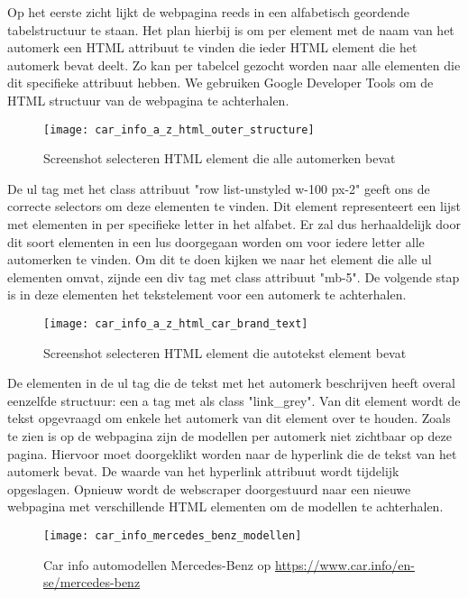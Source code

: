 Op het eerste zicht lijkt de webpagina reeds in een alfabetisch geordende tabelstructuur te staan. 
Het plan hierbij is om per element met de naam van het automerk een HTML attribuut te vinden die ieder HTML element die het automerk bevat deelt. Zo kan per tabelcel gezocht worden naar alle elementen die dit specifieke attribuut hebben.
We gebruiken Google Developer Tools om de HTML structuur van de webpagina te achterhalen.
\begin{figure}[H]
	\centering
	\texttt{[image: car\_info\_a\_z\_html\_outer\_structure]}
	\caption{Screenshot selecteren HTML element die alle automerken bevat}
\end{figure}
De ul tag met het class attribuut "row list-unstyled w-100 px-2" geeft ons de correcte selectors om deze elementen te vinden.
Dit element representeert een lijst met elementen in per specifieke letter in het alfabet. 
Er zal dus herhaaldelijk door dit soort elementen in een lus doorgegaan worden om voor iedere letter alle automerken te vinden.
Om dit te doen kijken we naar het element die alle ul elementen omvat, zijnde een div tag met class attribuut "mb-5".
De volgende stap is in deze elementen het tekstelement voor een automerk te achterhalen.
\begin{figure}[H]
	\centering
	\texttt{[image: car\_info\_a\_z\_html\_car\_brand\_text]}
	\caption{Screenshot selecteren HTML element die autotekst element bevat}
\end{figure}
De elementen in de ul tag die de tekst met het automerk beschrijven heeft overal eenzelfde structuur:
een a tag met als class "link\_grey". Van dit element wordt de tekst opgevraagd om enkele het automerk van dit element over te houden.
Zoals te zien is op de webpagina zijn de modellen per automerk niet zichtbaar op deze pagina. Hiervoor moet doorgeklikt worden naar de hyperlink die de tekst van het automerk bevat.
De waarde van het hyperlink attribuut wordt tijdelijk opgeslagen.
Opnieuw wordt de webscraper doorgestuurd naar een nieuwe webpagina met verschillende HTML elementen om de modellen te achterhalen. 

\begin{figure}[H]
	\centering
	\texttt{[image: car\_info\_mercedes\_benz\_modellen]}
	\caption{Car info automodellen Mercedes-Benz op \url{https://www.car.info/en-se/mercedes-benz}}
\end{figure}

